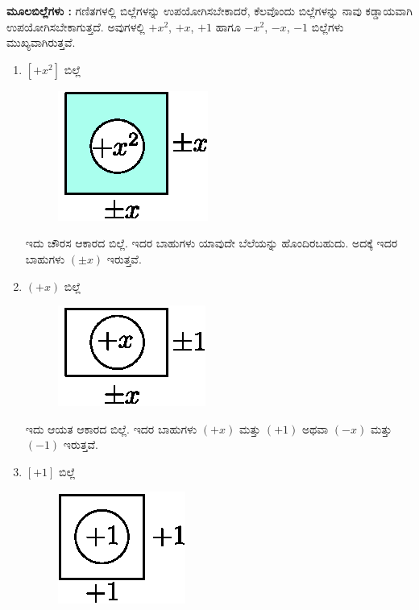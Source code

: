 \noindent
{\textbf{ಮೂಲಬಿಲ್ಲೆಗಳು :}} ಗಣಿತಗಳಲ್ಲಿ ಬಿಲ್ಲೆಗಳನ್ನು ಉಪಯೋಗಿಸಬೇಕಾದರೆ, ಕೆಲವೊಂದು ಬಿಲ್ಲೆಗಳನ್ನು ನಾವು ಕಡ್ಡಾಯವಾಗಿ ಉಪಯೋಗಿಸಬೇಕಾಗುತ್ತದೆ. ಅವುಗಳಲ್ಲಿ  $+x^2$, $+x$, $+1$ ಹಾಗೂ $-x^{2}$, $-x$, $-1$  ಬಿಲ್ಲೆಗಳು ಮುಖ್ಯವಾಗಿರುತ್ತವೆ. 


\begin{enumerate}
\item $[+x^2]$ ಬಿಲ್ಲೆ 
\begin{figure}[H]
\centering
\includegraphics[scale=0.8]{src/figure/chap3/fig3-4a.eps}
\end{figure}

ಇದು ಚೌರಸ ಆಕಾರದ ಬಿಲ್ಲೆ. ಇದರ ಬಾಹುಗಳು ಯಾವುದೇ ಬೆಲೆಯನ್ನು ಹೊಂದಿರಬಹುದು. ಅದಕ್ಕೆ ಇದರ ಬಾಹುಗಳು $(\pm x)$ ಇರುತ್ತವೆ.

\item $(+x)$ ಬಿಲ್ಲೆ 
\begin{figure}[H]
\centering
\includegraphics[scale=0.8]{src/figure/chap3/fig3-4b.eps}
\end{figure}

ಇದು ಆಯತ ಆಕಾರದ ಬಿಲ್ಲೆ. ಇದರ ಬಾಹುಗಳು $(+x)$ ಮತ್ತು $(+1)$ ಅಥವಾ $(-x)$ ಮತ್ತು $(-1)$ ಇರುತ್ತವೆ.

\item $[+1]$ ಬಿಲ್ಲೆ 
\begin{figure}[H]
\centering
\includegraphics[scale=0.8]{src/figure/chap3/fig3-4c.eps}
\end{figure}


\end{enumerate}
